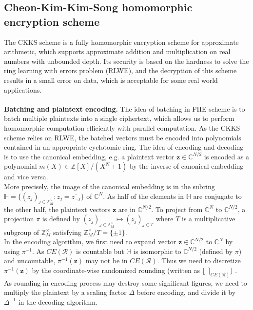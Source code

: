     \subsection{Cheon-Kim-Kim-Song homomorphic encryption scheme} 
    The CKKS scheme is a fully homomorphic encryption scheme for approximate arithmetic, which supports approximate addition and multiplication on real numbers with unbounded depth. Its security is based on the hardness to solve the ring learning with errors problem (RLWE), and the decryption of this scheme results in a small error on data, which is acceptable for some real world applications.\\
    \\
    \textbf{Batching and plaintext encoding.} 
    The idea of batching in FHE scheme is to batch multiple plaintexts into a single ciphertext, which allows us to perform homomorphic computation efficiently with parallel computation. As the CKKS scheme relies on RLWE, the batched vectors must be encoded into polynomials contained in an appropriate cyclotomic ring. The idea of encoding and decoding is to use the canonical embedding, e.g.\@{} a plaintext vector $\mathbf{z} \in \mathbb{C}^{N/2}$ is encoded as a polynomial $m(X) \in \mathbb{Z}[X]/(X^N +1)$ by the inverse of canonical embedding and vice versa. \\
    More precisely, the image of the canonical embedding is in the subring $\mathbb{H} = \{(z_j)_{j \in \mathbb{Z}_M^{\times}}: z_j = \overline{z_{-j}} \}$ of  $\mathbb{C}^N$. As half of the elements in $\mathbb{H}$ are conjugate to the other half, the plaintext vectors $\mathbf{z}$ are in $\mathbb{C}^{N/2}$. To project from $\mathbb{C}^{N}$ to $\mathbb{C}^{N/2}$, a projection $\pi$ is defined by $(z_j)_{j \in \mathbb{Z}_M^{\times}} \mapsto (z_j)_{j \in T}$ where $T$ is a multiplicative subgroup of $\mathbb{Z}_M^{\times}$ satisfying $\mathbb{Z}_M^{\times} / T = \{ \pm 1\}$.\\
    In the encoding algorithm, we first need to expand vector $\mathbf{z} \in \mathbb{C}^{N/2}$ to $\mathbb{C}^{N}$ by using $\pi^{-1}$.  As $CE(\mathcal{R})$ is countable but $\mathbb{H}$ is isomorphic to $\mathbb{C}^{N/2}$ (defined by $\pi$) and uncountable, $\pi^{-1}(\mathbf{z})$ may not be in  $CE(\mathcal{R})$. Thus we need to discretize $\pi^{-1}(\mathbf{z})$ by the coordinate-wise randomized rounding (written as $\lfloor\,\,  \rceil_{CE(\mathcal{R})}$) \cite{toolkitRLWE}. \\
    As rounding in encoding process may destroy some significant figures, we need to multiply the plaintext by a scaling factor $\Delta$ before encoding, and divide it by $\Delta^{-1}$ in the decoding algorithm. \\
